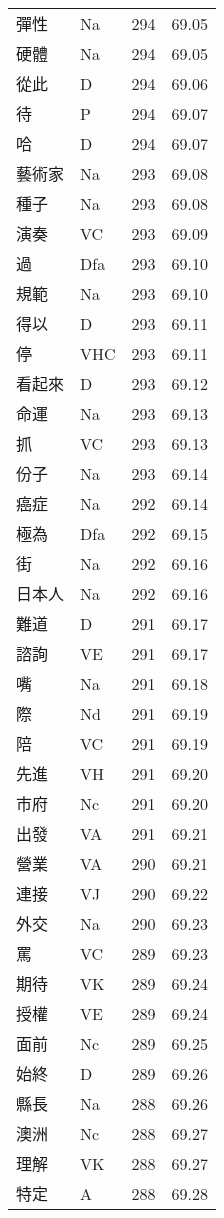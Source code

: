 \documentclass[twocolumn]{book}
\begin{document}
\begin{supertabular}{llrr}
彈性 & Na & 294 &  69.05\\
硬體 & Na & 294 &  69.05\\
從此 & D & 294 &  69.06\\
待 & P & 294 &  69.07\\
哈 & D & 294 &  69.07\\
藝術家 & Na & 293 &  69.08\\
種子 & Na & 293 &  69.08\\
演奏 & VC & 293 &  69.09\\
過 & Dfa & 293 &  69.10\\
規範 & Na & 293 &  69.10\\
得以 & D & 293 &  69.11\\
停 & VHC & 293 &  69.11\\
看起來 & D & 293 &  69.12\\
命運 & Na & 293 &  69.13\\
抓 & VC & 293 &  69.13\\
份子 & Na & 293 &  69.14\\
癌症 & Na & 292 &  69.14\\
極為 & Dfa & 292 &  69.15\\
街 & Na & 292 &  69.16\\
日本人 & Na & 292 &  69.16\\
難道 & D & 291 &  69.17\\
諮詢 & VE & 291 &  69.17\\
嘴 & Na & 291 &  69.18\\
際 & Nd & 291 &  69.19\\
陪 & VC & 291 &  69.19\\
先進 & VH & 291 &  69.20\\
市府 & Nc & 291 &  69.20\\
出發 & VA & 291 &  69.21\\
營業 & VA & 290 &  69.21\\
連接 & VJ & 290 &  69.22\\
外交 & Na & 290 &  69.23\\
罵 & VC & 289 &  69.23\\
期待 & VK & 289 &  69.24\\
授權 & VE & 289 &  69.24\\
面前 & Nc & 289 &  69.25\\
始終 & D & 289 &  69.26\\
縣長 & Na & 288 &  69.26\\
澳洲 & Nc & 288 &  69.27\\
理解 & VK & 288 &  69.27\\
特定 & A & 288 &  69.28\\

\end{supertabular}
\end{document}
